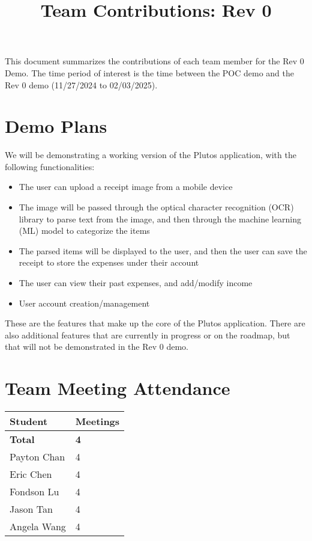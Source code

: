 \documentclass{article}
\title{Team Contributions: Rev 0\\\progname}
\author{\authname}
\date{}
\begin{document}
\maketitle

This document summarizes the contributions of each team member for the Rev 0
Demo.  The time period of interest is the time between the POC demo and the Rev
0 demo (11/27/2024 to 02/03/2025).

\section{Demo Plans}

We will be demonstrating a working version of the Plutos application, with the
following functionalities:
\begin{itemize}
    \item The user can upload a receipt image from a mobile device
    \item The image will be passed through the optical character recognition
    (OCR) library to parse text from the image, and then through the machine
    learning (ML) model to categorize the items
    \item The parsed items will be displayed to the user, and then the user can
    save the receipt to store the expenses under their account
    \item The user can view their past expenses, and add/modify income
    \item User account creation/management
\end{itemize}

\noindent These are the features that make up the core of the Plutos
application. There are also additional features that are currently in progress
or on the roadmap, but that will not be demonstrated in the Rev 0 demo.

\section{Team Meeting Attendance}


\begin{table}[H]
\centering
\begin{tabular}{ll}
\toprule
\textbf{Student} & \textbf{Meetings}\\
\midrule
\textbf{Total} & \textbf{4}\\
Payton Chan & 4\\
Eric Chen & 4\\
Fondson Lu & 4\\
Jason Tan & 4\\
Angela Wang & 4\\
\bottomrule
\end{tabular}
\end{table}
\end{document}
